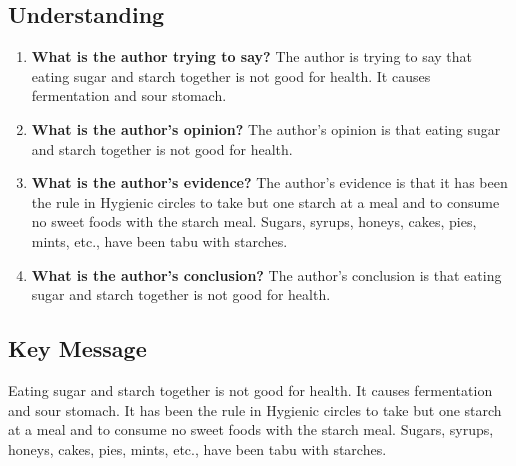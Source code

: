 \documentclass[a4paper, 12pt]{article}
\begin{document}
\subsection*{Understanding}
\begin{enumerate}
    \item \textbf{What is the author trying to say?} The author is trying to say that eating sugar and starch together is not good for health. It causes fermentation and sour stomach.
    \item \textbf{What is the author's opinion?} The author's opinion is that eating sugar and starch together is not good for health.
    \item \textbf{What is the author's evidence?} The author's evidence is that it has been the rule in Hygienic circles to take but one starch at a meal and to consume no sweet foods with the starch meal. Sugars, syrups, honeys, cakes, pies, mints, etc., have been tabu with starches.
    \item \textbf{What is the author's conclusion?} The author's conclusion is that eating sugar and starch together is not good for health.
\end{enumerate}
\subsection*{Key Message}
Eating sugar and starch together is not good for health. It causes fermentation and sour stomach. It has been the rule in Hygienic circles to take but one starch at a meal and to consume no sweet foods with the starch meal. Sugars, syrups, honeys, cakes, pies, mints, etc., have been tabu with starches.










%
%
\end{document}
